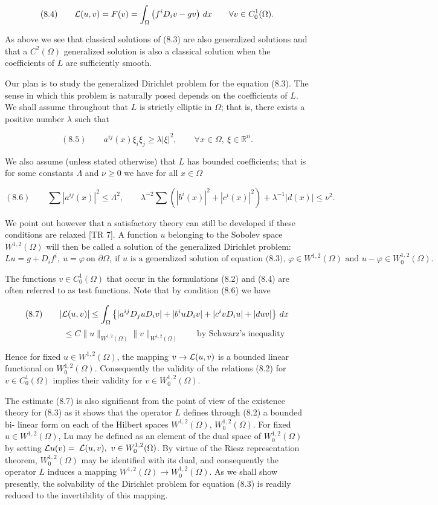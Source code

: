 
\[
(8.4)\qquad \mathcal{L}(u,v)=F(v)=\int_{\Omega} \left(f^i D_i v-gv\right)\,dx \qquad \forall v\in C_0^1(\Omega).
\]

As above we see that classical solutions of (8.3) are also generalized solutions and
that a $C^2(\Omega)$ generalized solution is also a classical solution when the coefficients of
$L$ are sufficiently smooth.

Our plan is to study the generalized Dirichlet problem for the equation (8.3).
The sense in which this problem is naturally posed depends on the coefficients of
$L$. We shall assume throughout that $L$ is strictly elliptic in $\Omega$; that is, there exists a
positive number $\lambda$ such that

\[
(8.5)\qquad a^{ij}(x)\xi_i\xi_j\geq \lambda |\xi|^2,\qquad \forall x\in\Omega,\ \xi\in\mathbb{R}^n.
\]

We also assume (unless stated otherwise) that $L$ has bounded coefficients; that is
for some constants $\Lambda$ and $\nu\geq 0$ we have for all $x\in\Omega$

\[
(8.6)\qquad \sum |a^{ij}(x)|^2\leq \Lambda^2,\qquad \lambda^{-2}\sum\left(|b^i(x)|^2+|c^i(x)|^2\right)+\lambda^{-1}|d(x)|\leq \nu^2.
\]

We point out however that a satisfactory theory can still be developed if these
conditions are relaxed [TR 7]. A function $u$ belonging to the Sobolev space
$W^{1,2}(\Omega)$ will then be called a solution of the generalized Dirichlet problem:
\[
Lu=g+D_if^i,\ u=\varphi\ \text{on }\partial\Omega,\ \text{if }u\text{ is a generalized solution of equation (8.3), }\varphi\in
W^{1,2}(\Omega)\text{ and }u-\varphi\in W_0^{1,2}(\Omega).
\]

The functions $v\in C_0^1(\Omega)$ that occur in the formulations (8.2) and (8.4) are often
referred to as test functions. Note that by condition (8.6) we have

\[
(8.7)\qquad |\mathcal{L}(u,v)|\leq \int_{\Omega}\left\{|a^{ij}D_j uD_iv|+|b^i uD_iv|+|c^i vD_i u|+|duv|\right\}\,dx
\]
\[
\qquad\qquad\leq C\|u\|_{W^{1,2}(\Omega)}\|v\|_{W^{1,2}(\Omega)}\qquad \text{by Schwarz's inequality}
\]

Hence for fixed $u\in W^{1,2}(\Omega)$, the mapping $v\to \mathcal{L}(u,v)$ is a bounded linear functional on $W_0^{1,2}(\Omega)$. Consequently the validity of the relations (8.2) for $v\in C_0^1(\Omega)$
implies their validity for $v\in W_0^{1,2}(\Omega)$.

The estimate (8.7) is also significant from the point of view of the existence
theory for (8.3) as it shows that the operator $L$ defines through (8.2) a bounded bi-
linear form on each of the Hilbert spaces $W^{1,2}(\Omega)$, $W_0^{1,2}(\Omega)$. For fixed $u\in W^{1,2}(\Omega)$,
Lu may be defined as an element of the dual space of $W_0^{1,2}(\Omega)$ by setting $\mathcal{L} u(v)=$
$\mathcal{L}(u,v),\ v\in W_0^{1,2}(\Omega)$. By virtue of the Riesz representation theorem, $W_0^{1,2}(\Omega)$ may
be identified with its dual, and consequently the operator $L$ induces a mapping
$W^{1,2}(\Omega)\to W_0^{1,2}(\Omega)$. As we shall show presently, the solvability of the Dirichlet
problem for equation (8.3) is readily reduced to the invertibility of this mapping.

